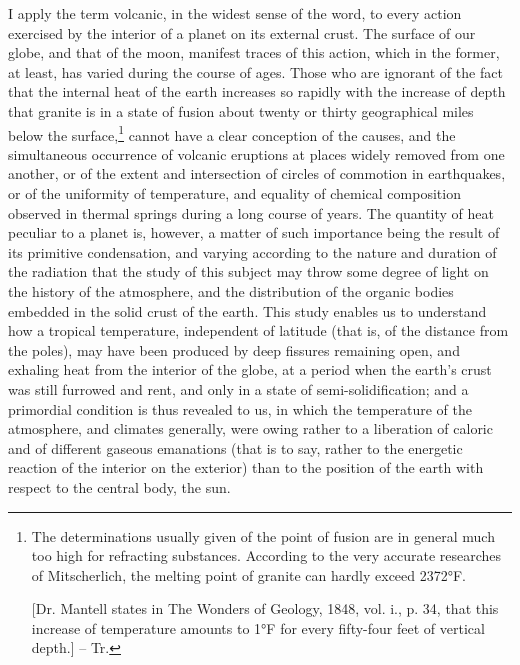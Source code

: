 I apply the term volcanic, in the widest sense of the word, to every action exercised by the interior of a planet on its external crust. The surface of our globe, and that of the moon, manifest traces of this action, which in the former, at least, has varied during the course of ages. Those who are ignorant of the fact that the internal heat of the earth increases so rapidly with the increase of depth that granite is in a state of fusion about twenty or thirty geographical miles below the surface,\footnote{The determinations usually given of the point of fusion are in general much too high for refracting substances. According to the very accurate researches of Mitscherlich, the melting point of granite can hardly exceed 2372°F.

[Dr. Mantell states in The Wonders of Geology, 1848, vol. i., p. 34, that this increase of temperature amounts to 1°F for every fifty-four feet of vertical depth.] -- Tr.
} cannot have a clear conception of the causes, and the simultaneous occurrence of volcanic eruptions at places widely removed from one another, or of the extent and intersection of circles of commotion in earthquakes, or of the uniformity of temperature, and equality of chemical composition observed in thermal springs during a long course of years. The quantity of heat peculiar to a planet is, however, a matter of such importance being the result of its primitive condensation, and varying according to the nature and duration of the radiation that the study of this subject may throw some degree of light on the history of the atmosphere, and the distribution of the organic bodies embedded in the solid crust of the earth. This study enables us to understand how a tropical temperature, independent of latitude (that is, of the distance from the poles), may have been produced by deep fissures remaining open, and exhaling heat from the interior of the globe, at a period when the earth's crust was still furrowed and rent, and only in a state of semi-solidification; and a primordial condition is thus revealed to us, in which the temperature of the atmosphere, and climates generally, were owing rather to a liberation of caloric and of different gaseous emanations (that is to say, rather to the energetic reaction of the interior on the exterior) than to the position of the earth with respect to the central body, the sun.

